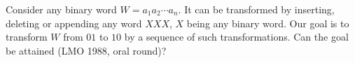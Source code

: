 Consider any binary word $W = a_1a_2 \cdots a_n$. It can be transformed by inserting, deleting or appending any word $XXX$, $X$ being any binary word. Our goal is to transform $W$ from $01$ to $10$ by a sequence of such transformations. Can the goal be attained (LMO 1988, oral round)?
